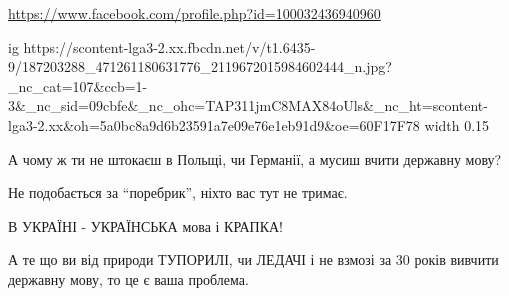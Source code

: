  
 
 
 
 

\url{https://www.facebook.com/profile.php?id=100032436940960}\par
\ifcmt
  ig https://scontent-lga3-2.xx.fbcdn.net/v/t1.6435-9/187203288_471261180631776_2119672015984602444_n.jpg?_nc_cat=107&ccb=1-3&_nc_sid=09cbfe&_nc_ohc=TAP311jmC8MAX84oUls&_nc_ht=scontent-lga3-2.xx&oh=5a0bc8a9d6b23591a7e09e76e1eb91d9&oe=60F17F78
  width 0.15
\fi

А чому ж ти не штокаєш в Польщі, чи Германії, а мусиш вчити державну мову?

Не подобається за \enquote{поребрик}, ніхто вас тут не тримає.

В УКРАЇНІ - УКРАЇНСЬКА мова і КРАПКА!

А те що ви від природи ТУПОРИЛІ, чи ЛЕДАЧІ і не взмозі за 30 років вивчити
державну мову, то це є ваша проблема.

